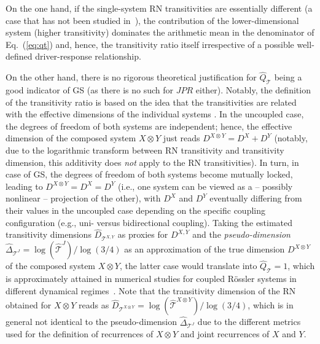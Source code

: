 		On the one hand, if the single-system RN transitivities are essentially different (a case that has not been studied in~\cite{Feldhoff2013}), the contribution of the lower-dimensional system (higher transitivity) dominates the arithmetic mean in the denominator of Eq.~(\ref{eq:qt}) and, hence, the transitivity ratio itself irrespective of a possible well-defined driver-response relationship.

		On the other hand, there is no rigorous theoretical justification for $\hat{Q}_{\mathcal{T}}$ being a good indicator of GS (as there is no such for $JPR$ either). Notably, the definition of the transitivity ratio is based on the idea that the transitivities are related with the effective dimensions of the individual systems \cite{Donner2015RPBook}. In the uncoupled case, the degrees of freedom of both systems are independent; hence, the effective dimension of the composed system $X\otimes Y$ just reads $D^{X\otimes Y}=D^X + D^Y$ (notably, due to the logarithmic transform between RN transitivity and transitivity dimension, this additivity does \emph{not} apply to the RN transitivities). In turn, in case of GS, the degrees of freedom of both systems become mutually locked, leading to $D^{X\otimes Y}=D^X=D^Y$ (i.e., one system can be viewed as a -- possibly nonlinear -- projection of the other), with $D^X$ and $D^Y$ eventually differing from their values in the uncoupled case depending on the specific coupling configuration (e.g., uni- versus bidirectional coupling). Taking the estimated transitivity dimensions $\hat{D}_{\mathcal{T}^{X,Y}}$ as proxies for $D^{X,Y}$ and the \emph{pseudo-dimension} $\hat{\Delta}_{\mathcal{T}^J}=\log(\hat{\mathcal{T}}^J)/\log(3/4)$ as an approximation of the true dimension $D^{X\otimes Y}$ of the composed system $X\otimes Y$, the latter case would translate into $\hat{Q}_{\mathcal{T}}=1$, which is approximately attained in numerical studies for coupled R\"ossler systems in different dynamical regimes~\cite{Feldhoff2013}. Note that the transitivity dimension of the RN obtained for $X\otimes Y$ reads as $\hat{D}_{\mathcal{T}^{X\otimes Y}}=\log(\hat{\mathcal{T}}^{X\otimes Y})/\log(3/4)$, which is in general not identical to the pseudo-dimension $\hat{\Delta}_{\mathcal{T}^J}$ due to the different metrics used for the definition of recurrences of $X\otimes Y$ and joint recurrences of $X$ and $Y$.

